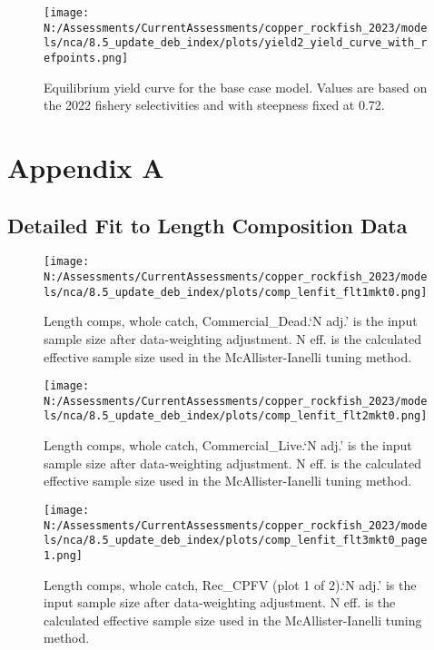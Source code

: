 \documentclass[11pt,
  english,
  letterpaper,
]{article}
\begin{document}
\begin{figure}
\centering
\texttt{[image: N:/Assessments/CurrentAssessments/copper\_rockfish\_2023/models/nca/8.5\_update\_deb\_index/plots/yield2\_yield\_curve\_with\_refpoints.png]}
\caption{Equilibrium yield curve for the base case model. Values are based on the 2022 fishery selectivities and with steepness fixed at 0.72.\label{fig:yield}}
\end{figure}

\hypertarget{detailed-fit-comps}{%
\section{Appendix A}\label{detailed-fit-comps}}

\hypertarget{length-data}{%
\subsection{Detailed Fit to Length Composition Data}\label{length-data}}

\begin{figure}
\centering
\texttt{[image: N:/Assessments/CurrentAssessments/copper\_rockfish\_2023/models/nca/8.5\_update\_deb\_index/plots/comp\_lenfit\_flt1mkt0.png]}
\caption{Length comps, whole catch, Commercial\_Dead.`N adj.' is the input sample size after data-weighting adjustment. N eff. is the calculated effective sample size used in the McAllister-Ianelli tuning method.\label{fig:comp_lenfit_flt1mkt0}}
\end{figure}

\begin{figure}
\centering
\texttt{[image: N:/Assessments/CurrentAssessments/copper\_rockfish\_2023/models/nca/8.5\_update\_deb\_index/plots/comp\_lenfit\_flt2mkt0.png]}
\caption{Length comps, whole catch, Commercial\_Live.`N adj.' is the input sample size after data-weighting adjustment. N eff. is the calculated effective sample size used in the McAllister-Ianelli tuning method.\label{fig:comp_lenfit_flt2mkt0}}
\end{figure}

\begin{figure}
\centering
\texttt{[image: N:/Assessments/CurrentAssessments/copper\_rockfish\_2023/models/nca/8.5\_update\_deb\_index/plots/comp\_lenfit\_flt3mkt0\_page1.png]}
\caption{Length comps, whole catch, Rec\_CPFV (plot 1 of 2).`N adj.' is the input sample size after data-weighting adjustment. N eff. is the calculated effective sample size used in the McAllister-Ianelli tuning method.\label{fig:comp_lenfit_flt3mkt0_page1}}
\end{figure}
\end{document}
